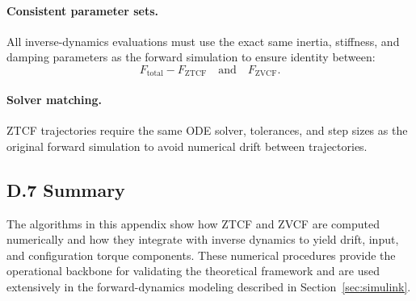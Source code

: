 \documentclass[12pt]{article}
\begin{document}
\paragraph{Consistent parameter sets.}
All inverse-dynamics evaluations must use the exact same inertia, stiffness, and damping parameters as the forward simulation to ensure identity between:
\[
  F_{\mathrm{total}} - F_{\mathrm{ZTCF}}
  \quad\text{and}\quad
  F_{\mathrm{ZVCF}}.
\]

\paragraph{Solver matching.}
ZTCF trajectories require the same ODE solver, tolerances, and step sizes as the original forward simulation to avoid numerical drift between trajectories.

\subsection{D.7 \quad Summary}

The algorithms in this appendix show how ZTCF and ZVCF are computed numerically and how they integrate with inverse dynamics to yield drift, input, and configuration torque components. These numerical procedures provide the operational backbone for validating the theoretical framework and are used extensively in the forward-dynamics modeling described in Section~\ref{sec:simulink}.
\end{document}
